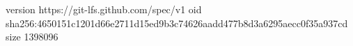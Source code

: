 version https://git-lfs.github.com/spec/v1
oid sha256:4650151c1201d66e2711d15ed9b3c74626aadd477b8d3a6295aecc0f35a937cd
size 1398096
